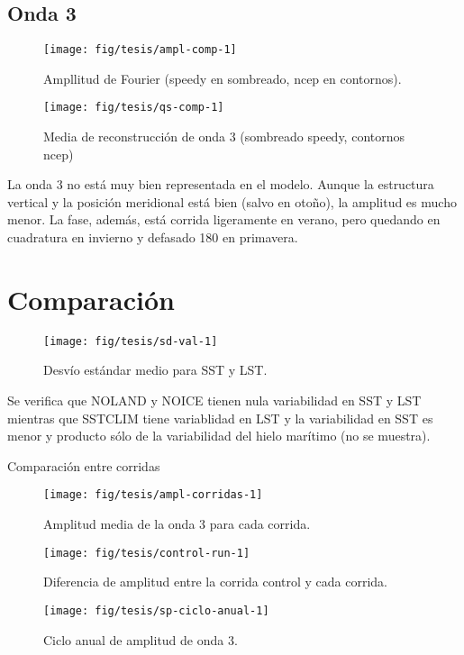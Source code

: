 \documentclass[spanish,a4paper]{book}
\begin{document}
\subsection{Onda 3}\label{onda-3-1}

\begin{figure*}
\texttt{[image: fig/tesis/ampl-comp-1]} \caption{Ampllitud de Fourier (speedy en sombreado, ncep en contornos).}\label{fig:ampl-comp}
\end{figure*}

\begin{figure*}
\texttt{[image: fig/tesis/qs-comp-1]} \caption{Media de reconstrucción de onda 3 (sombreado speedy, contornos ncep)}\label{fig:qs-comp}
\end{figure*}

La onda 3 no está muy bien representada en el modelo. Aunque la
estructura vertical y la posición meridional está bien (salvo en otoño),
la amplitud es mucho menor. La fase, además, está corrida ligeramente en
verano, pero quedando en cuadratura en invierno y defasado 180 en
primavera.

\section{Comparación}\label{comparacion}

\begin{figure}
\texttt{[image: fig/tesis/sd-val-1]} \caption{Desvío estándar medio para SST y LST.}\label{fig:sd-val}
\end{figure}

Se verifica que NOLAND y NOICE tienen nula variabilidad en SST y LST
mientras que SSTCLIM tiene variablidad en LST y la variabilidad en SST
es menor y producto sólo de la variabilidad del hielo marítimo (no se
muestra).

Comparación entre corridas

\begin{figure}
\texttt{[image: fig/tesis/ampl-corridas-1]} \caption{Amplitud media de la onda 3 para cada corrida.}\label{fig:ampl-corridas}
\end{figure}

\begin{figure}
\texttt{[image: fig/tesis/control-run-1]} \caption{Diferencia de amplitud entre la corrida control y cada corrida.}\label{fig:control-run}
\end{figure}

\begin{figure}
\texttt{[image: fig/tesis/sp-ciclo-anual-1]} \caption{Ciclo anual de amplitud de onda 3.}\label{fig:sp-ciclo-anual}
\end{figure}
\end{document}

